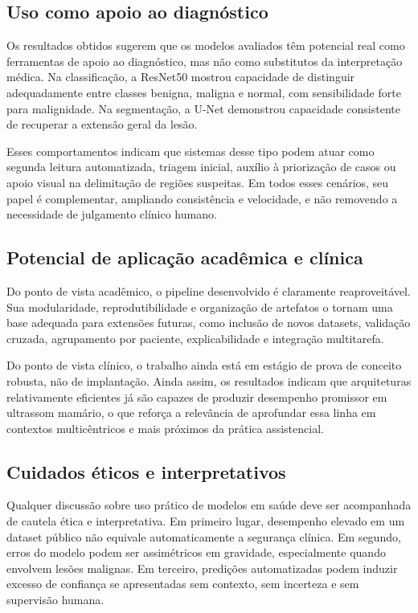 \documentclass[tcc,capa]{texufpel}
\begin{document}
\subsection{Uso como apoio ao diagnóstico}

Os resultados obtidos sugerem que os modelos avaliados têm potencial real como ferramentas de apoio ao diagnóstico, mas não como substitutos da interpretação médica. Na classificação, a ResNet50 mostrou capacidade de distinguir adequadamente entre classes benigna, maligna e normal, com sensibilidade forte para malignidade. Na segmentação, a U-Net demonstrou capacidade consistente de recuperar a extensão geral da lesão.

Esses comportamentos indicam que sistemas desse tipo podem atuar como segunda leitura automatizada, triagem inicial, auxílio à priorização de casos ou apoio visual na delimitação de regiões suspeitas. Em todos esses cenários, seu papel é complementar, ampliando consistência e velocidade, e não removendo a necessidade de julgamento clínico humano.

\subsection{Potencial de aplicação acadêmica e clínica}

Do ponto de vista acadêmico, o pipeline desenvolvido é claramente reaproveitável. Sua modularidade, reprodutibilidade e organização de artefatos o tornam uma base adequada para extensões futuras, como inclusão de novos datasets, validação cruzada, agrupamento por paciente, explicabilidade e integração multitarefa.

Do ponto de vista clínico, o trabalho ainda está em estágio de prova de conceito robusta, não de implantação. Ainda assim, os resultados indicam que arquiteturas relativamente eficientes já são capazes de produzir desempenho promissor em ultrassom mamário, o que reforça a relevância de aprofundar essa linha em contextos multicêntricos e mais próximos da prática assistencial.

\subsection{Cuidados éticos e interpretativos}

Qualquer discussão sobre uso prático de modelos em saúde deve ser acompanhada de cautela ética e interpretativa. Em primeiro lugar, desempenho elevado em um dataset público não equivale automaticamente a segurança clínica. Em segundo, erros do modelo podem ser assimétricos em gravidade, especialmente quando envolvem lesões malignas. Em terceiro, predições automatizadas podem induzir excesso de confiança se apresentadas sem contexto, sem incerteza e sem supervisão humana.
\end{document}
